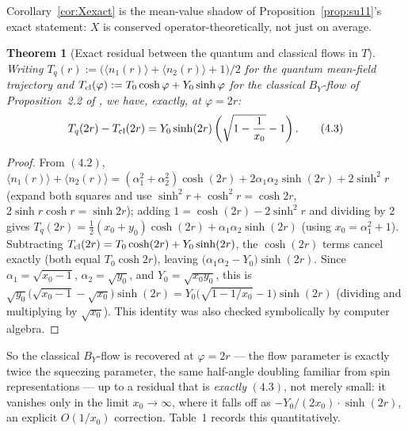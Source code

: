 \documentclass[11pt]{amsart}
\newtheorem{theorem}{Theorem}[section]
\theoremstyle{remark}
\begin{document}
Corollary~\ref{cor:Xexact} is the mean-value shadow of Proposition~\ref{prop:su11}'s exact statement: $X$ is conserved operator-theoretically, not just on average.

\begin{theorem}[Exact residual between the quantum and classical flows in $T$]\label{thm:residual}
Writing $T_q(r):=\bigl(\langle n_1(r)\rangle+\langle n_2(r)\rangle+1\bigr)/2$ for the quantum mean-field trajectory and $T_{\rm cl}(\varphi):=T_0\cosh\varphi+Y_0\sinh\varphi$ for the classical $B_Y$-flow of Proposition~2.2 of \cite{Ebert2026EigenCoord}, we have, exactly, at $\varphi=2r$:
\begin{equation}
T_q(2r)-T_{\rm cl}(2r)=Y_0\sinh(2r)\left(\sqrt{1-\frac1{x_0}}-1\right). \tag{4.3}
\end{equation}
\end{theorem}

\begin{proof}
From $(4.2)$, $\langle n_1(r)\rangle+\langle n_2(r)\rangle=(\alpha_1^2+\alpha_2^2)\cosh(2r)+2\alpha_1\alpha_2\sinh(2r)+2\sinh^2r$ (expand both squares and use $\sinh^2r+\cosh^2r=\cosh2r$, $2\sinh r\cosh r=\sinh2r$); adding $1=\cosh(2r)-2\sinh^2r$ and dividing by $2$ gives $T_q(2r)=\tfrac12(x_0+y_0)\cosh(2r)+\alpha_1\alpha_2\sinh(2r)$ (using $x_0=\alpha_1^2+1$). Subtracting $T_{\rm cl}(2r)=T_0\cosh(2r)+Y_0\sinh(2r)$, the $\cosh(2r)$ terms cancel exactly (both equal $T_0\cosh2r$), leaving $\bigl(\alpha_1\alpha_2-Y_0\bigr)\sinh(2r)$. Since $\alpha_1=\sqrt{x_0-1}$, $\alpha_2=\sqrt{y_0}$, and $Y_0=\sqrt{x_0y_0}$, this is $\sqrt{y_0}\bigl(\sqrt{x_0-1}-\sqrt{x_0}\bigr)\sinh(2r)=Y_0\bigl(\sqrt{1-1/x_0}-1\bigr)\sinh(2r)$ (dividing and multiplying by $\sqrt{x_0}$). This identity was also checked symbolically by computer algebra.
\end{proof}

So the classical $B_Y$-flow is recovered at $\varphi=2r$ --- the flow parameter is exactly twice the squeezing parameter, the same half-angle doubling familiar from spin representations --- up to a residual that is \emph{exactly} $(4.3)$, not merely small: it vanishes only in the limit $x_0\to\infty$, where it falls off as $-Y_0/(2x_0)\cdot\sinh(2r)$, an explicit $O(1/x_0)$ correction. Table~1 records this quantitatively.
\end{document}
